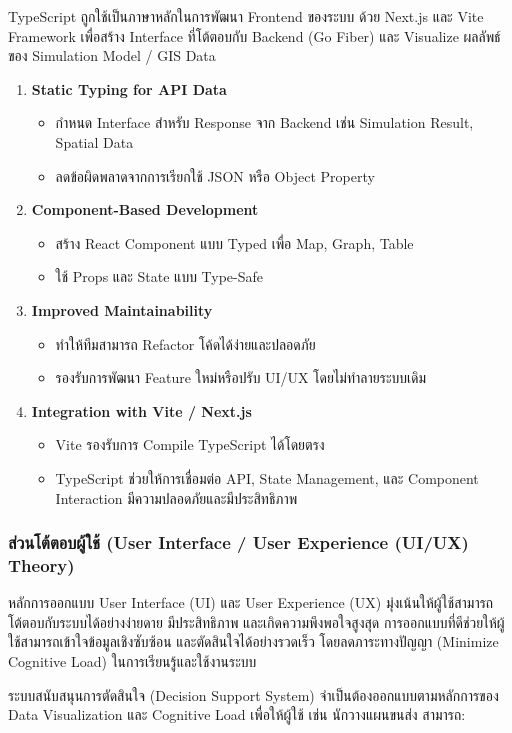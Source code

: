 TypeScript ถูกใช้เป็นภาษาหลักในการพัฒนา Frontend ของระบบ ด้วย Next.js และ Vite Framework เพื่อสร้าง Interface ที่โต้ตอบกับ Backend (Go Fiber) และ Visualize ผลลัพธ์ของ Simulation Model / GIS Data
\begin{enumerate}
    \item \textbf{Static Typing for API Data}
    \begin{itemize}
        \item กำหนด Interface สำหรับ Response จาก Backend เช่น Simulation Result, Spatial Data
        \item ลดข้อผิดพลาดจากการเรียกใช้ JSON หรือ Object Property
    \end{itemize}
    
    \item \textbf{Component-Based Development}
    \begin{itemize}
        \item สร้าง React Component แบบ Typed เพื่อ Map, Graph, Table
        \item ใช้ Props และ State แบบ Type-Safe
    \end{itemize}
    
    \item \textbf{Improved Maintainability}
    \begin{itemize}
        \item ทำให้ทีมสามารถ Refactor โค้ดได้ง่ายและปลอดภัย
        \item รองรับการพัฒนา Feature ใหม่หรือปรับ UI/UX โดยไม่ทำลายระบบเดิม
    \end{itemize}
    
    \item \textbf{Integration with Vite / Next.js}
    \begin{itemize}
        \item Vite รองรับการ Compile TypeScript ได้โดยตรง
        \item TypeScript ช่วยให้การเชื่อมต่อ API, State Management, และ Component Interaction มีความปลอดภัยและมีประสิทธิภาพ
    \end{itemize}
\end{enumerate}

\subsubsection{ส่วนโต้ตอบผู้ใช้ (User Interface / User Experience (UI/UX) Theory)}
\begin{mypara}
    \indent หลักการออกแบบ User Interface (UI) และ User Experience (UX) มุ่งเน้นให้ผู้ใช้สามารถโต้ตอบกับระบบได้อย่างง่ายดาย
    มีประสิทธิภาพ และเกิดความพึงพอใจสูงสุด การออกแบบที่ดีช่วยให้ผู้ใช้สามารถเข้าใจข้อมูลเชิงซับซ้อน
    และตัดสินใจได้อย่างรวดเร็ว โดยลดภาระทางปัญญา (Minimize Cognitive Load) ในการเรียนรู้และใช้งานระบบ

    \indent ระบบสนับสนุนการตัดสินใจ (Decision Support System) จำเป็นต้องออกแบบตามหลักการของ Data Visualization
    และ Cognitive Load เพื่อให้ผู้ใช้ เช่น นักวางแผนขนส่ง สามารถ:
\end{mypara}

